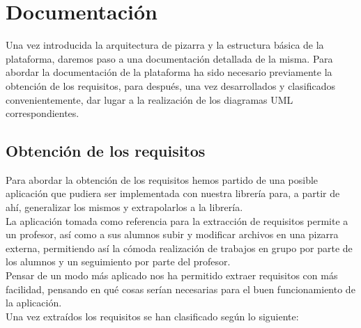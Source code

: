 \chapter{Documentación}
\lettrine[lines=1,slope=4pt,findent=0pt]{U}{}na vez introducida la arquitectura de pizarra y la estructura básica de la plataforma, daremos paso a una documentación detallada de la misma. Para abordar la documentación de la plataforma ha sido necesario previamente la obtención de los requisitos, para después, una vez desarrollados y clasificados convenientemente, dar lugar a la realización de los diagramas UML correspondientes.

\section{Obtención de los requisitos}
Para abordar la obtención de los requisitos hemos partido de una posible aplicación que pudiera ser implementada con nuestra librería para, a partir de ahí, generalizar los mismos y extrapolarlos a la librería.\\

La aplicación tomada como referencia para la extracción de requisitos permite a un profesor, así como a sus alumnos subir y modificar archivos en una pizarra externa, permitiendo así la cómoda realización de trabajos en grupo por parte de los alumnos y un seguimiento por parte del profesor.\\

Pensar de un modo más aplicado nos ha permitido extraer requisitos con más facilidad, pensando en qué cosas serían necesarias para el buen funcionamiento de la aplicación.\\

Una vez extraídos los requisitos se han clasificado según lo siguiente:

